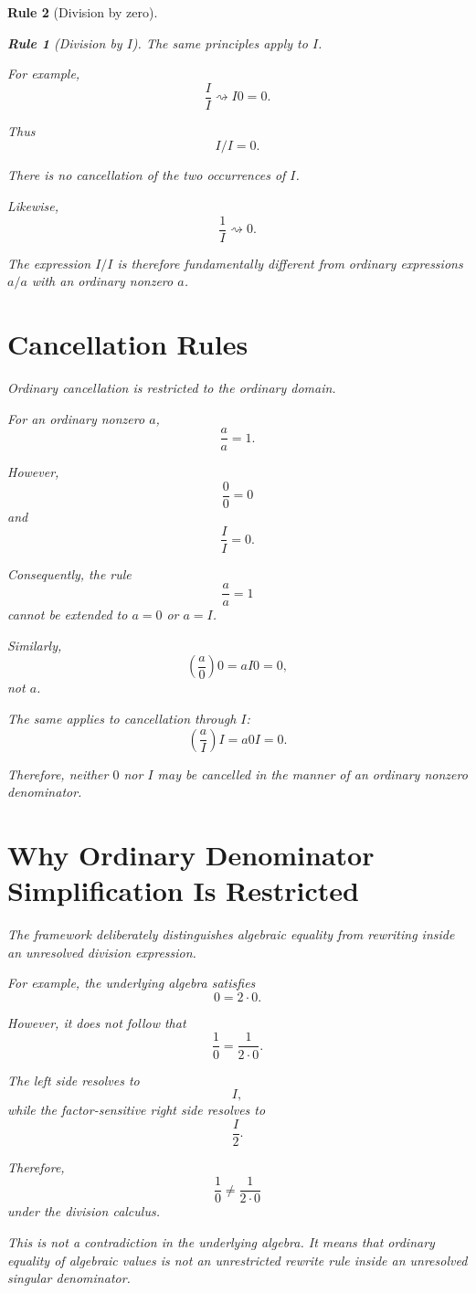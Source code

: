 \documentclass[11pt,a4paper]{article}
\newtheorem{rulethm}{Rule}[section]
\begin{document}
\begin{rulethm}[Division by zero]
\begin{rulethm}[Division by $I$]
The same principles apply to $I$.

For example,
\[
\frac{I}{I}
\rightsquigarrow I0
=0.
\]

Thus
\[
\boxed{I/I=0}.
\]

There is no cancellation of the two occurrences of $I$.

Likewise,
\[
\frac{1}{I}
\rightsquigarrow0.
\]

The expression $I/I$ is therefore fundamentally different from ordinary
expressions $a/a$ with an ordinary nonzero $a$.

\section{Cancellation Rules}

Ordinary cancellation is restricted to the ordinary domain.

For an ordinary nonzero $a$,
\[
\frac{a}{a}=1.
\]

However,
\[
\frac{0}{0}=0
\]
and
\[
\frac{I}{I}=0.
\]

Consequently, the rule
\[
\frac{a}{a}=1
\]
cannot be extended to $a=0$ or $a=I$.

Similarly,
\[
\left(\frac{a}{0}\right)0
=
aI0
=
0,
\]
not $a$.

The same applies to cancellation through $I$:
\[
\left(\frac{a}{I}\right)I
=
a0I
=
0.
\]

Therefore, neither $0$ nor $I$ may be cancelled in the manner of an
ordinary nonzero denominator.

\section{Why Ordinary Denominator Simplification Is Restricted}

The framework deliberately distinguishes algebraic equality from
rewriting inside an unresolved division expression.

For example, the underlying algebra satisfies
\[
0=2\cdot0.
\]

However, it does not follow that
\[
\frac{1}{0}
=
\frac{1}{2\cdot0}.
\]

The left side resolves to
\[
I,
\]
while the factor-sensitive right side resolves to
\[
\frac{I}{2}.
\]

Therefore,
\[
\frac{1}{0}\neq\frac{1}{2\cdot0}
\]
under the division calculus.

This is not a contradiction in the underlying algebra. It means that
ordinary equality of algebraic values is not an unrestricted rewrite rule
inside an unresolved singular denominator.


\end{rulethm}
\end{rulethm}
\end{document}
